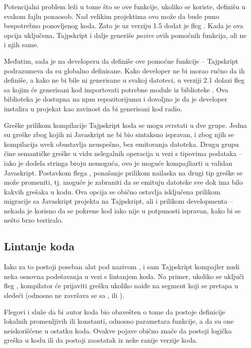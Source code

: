 Potencijalni problem leži u tome što se ove funkcije, ukoliko se koriste, definišu u svakom fajlu ponaosob.
Nad velikim projektima ovo može da bude puno bespotrebno ponovljenog koda.
Zato je uz verziju 1.5 dodat je fleg .
Kada je ova opcija uključena, Tajpskript i dalje generiše \textit{pozive} ovih pomoćnih funkcija, ali ne i njih same.

Međutim, sada je na developeru da definiše ove pomoćne funkcije -- Tajpskript podrazumeva da su globalno definisane.
Kako developer ne bi morao ručno da ih definiše, a kako ne bi bile ni generisane u svakoj datoteci, u verziji 2.1 dolazi fleg  sa kojim će generisani kod importovati potrebne module iz biblioteke .
Ova biblioteka je dostupna na npm repozitorijumu i dovoljno je da je developer instalira u projekat kao zavinost da bi generisani kod radio.

Greške prilikom kompilacije Tajpskript koda se mogu svrstati u dve grupe.
Jedna su greške zbog kojih ni Javaskript ne bi bio sintaksno ispravan, i zbog njih se kompilacija uvek obustavlja neuspešno, bez emitovanja datoteka.
Drugu grupu čine semantičke greške u vidu nelegalnih operacija u vezi s tipovima podataka -- iako je dodela stringa broju nemoguća, ovo je moguće kompajliarti u validan Javaskript.
Postavkom flega , ponašanje prilikom nailaska na drugi tip greške se može promeniti, tj. moguće je zabraniti da se emituju  datoteke sve dok ima bilo kakvih grešaka u  kodu.
Ova opcija se obično ostavlja isključena prilikom migracije sa Javaskript projekta na Tajpskript, ali i prilikom developmenta -- nekada je korisno da se pokrene kod iako nije u potpunosti ispravan, kako bi se nešto brzo testiralo.

\subsection{Lintanje koda}

Iako za to postoji poseban alat pod nazivom , i sam Tajpskript kompajler nudi neka osnovna podešavanja u vezi s lintanjem koda.
Na primer, ukoliko se uključi fleg , kompilator će prijaviti grešku ukoliko naiđe na  segment koji se pretapa u sledeći (odnosno ne završava se sa ,  ili ).

Flegovi  i  služe da bi autor koda bio obavešten o tome da postoje definicije lokalnih promenljivih ili konstanti, odnosno parametara funkcije, a da su one neiskorišćene u ostatku koda.
Ovakve pojave obično znače da postoji logička greška u kodu ili da postoji zaostatak iz neke ranije verzije koda.

